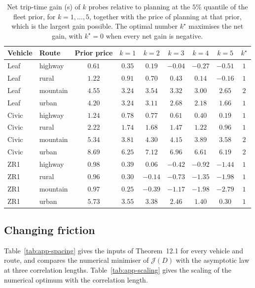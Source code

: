 \documentclass[12pt, twoside]{amsart}
\theoremstyle{definition}
\newcommand{\mainref}[2]{#2}
\begin{document}
\begin{table}[htbp]
\centering\small
\setlength{\tabcolsep}{4.5pt}
\caption{Net trip-time gain (s) of $k$ probes relative to planning at the $5\%$ quantile of the fleet prior, for $k=1,\dots,5$, together with the price of planning at that prior, which is the largest gain possible. The optimal number $k^\star$ maximises the net gain, with $k^\star=0$ when every net gain is negative.}\label{tab:app-kstar}
\begin{tabular}{llccccccc}
\toprule
Vehicle & Route & Prior price & $k=1$ & $k=2$ & $k=3$ & $k=4$ & $k=5$ & $k^\star$\\
\midrule
Leaf & highway & $0.61$ & $0.35$ & $0.19$ & $-0.04$ & $-0.27$ & $-0.51$ & $1$\\
Leaf & rural & $1.22$ & $0.91$ & $0.70$ & $0.43$ & $0.14$ & $-0.16$ & $1$\\
Leaf & mountain & $4.55$ & $3.24$ & $3.54$ & $3.32$ & $3.00$ & $2.65$ & $2$\\
Leaf & urban & $4.20$ & $3.24$ & $3.11$ & $2.68$ & $2.18$ & $1.66$ & $1$\\
Civic & highway & $1.24$ & $0.78$ & $0.77$ & $0.61$ & $0.40$ & $0.19$ & $1$\\
Civic & rural & $2.22$ & $1.74$ & $1.68$ & $1.47$ & $1.22$ & $0.96$ & $1$\\
Civic & mountain & $5.34$ & $3.81$ & $4.30$ & $4.15$ & $3.89$ & $3.58$ & $2$\\
Civic & urban & $8.69$ & $6.25$ & $7.12$ & $6.96$ & $6.61$ & $6.19$ & $2$\\
ZR1 & highway & $0.98$ & $0.39$ & $0.06$ & $-0.42$ & $-0.92$ & $-1.44$ & $1$\\
ZR1 & rural & $0.96$ & $0.30$ & $-0.14$ & $-0.73$ & $-1.35$ & $-1.98$ & $1$\\
ZR1 & mountain & $0.97$ & $0.25$ & $-0.39$ & $-1.17$ & $-1.98$ & $-2.79$ & $1$\\
ZR1 & urban & $5.73$ & $3.55$ & $3.38$ & $2.46$ & $1.40$ & $0.30$ & $1$\\
\bottomrule
\end{tabular}
\end{table}

\subsection{Changing friction}

Table~\ref{tab:app-spacing} gives the inputs of Theorem~\mainref{thm:spacing}{12.1} for every vehicle and route,
and compares the numerical minimiser of $\mathcal J(D)$ with the asymptotic law at three correlation lengths.
Table~\ref{tab:app-scaling} gives the scaling of the numerical optimum with the correlation length.
\end{document}
